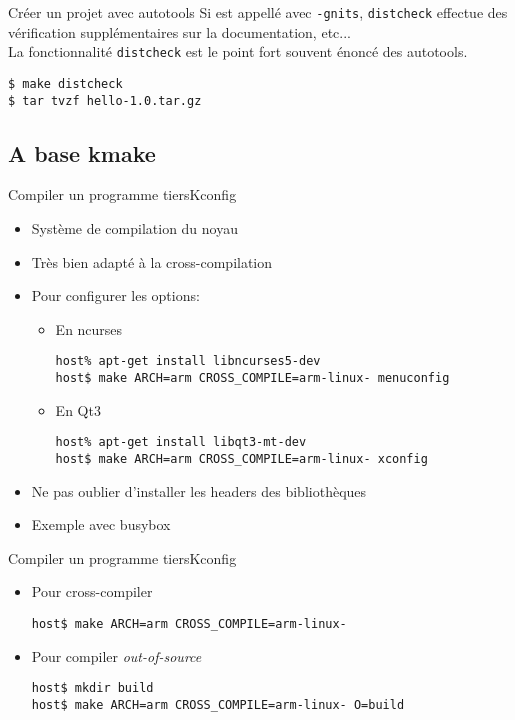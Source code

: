 \begin{frame}[fragile=singleslide]{Créer un projet avec autotools}
  Si   est appellé avec  \verb+-gnits+, \verb+distcheck+
  effectue des vérification supplémentaires sur la documentation,
  etc...
  \\[2ex]
  La fonctionnalité \verb+distcheck+ est  le point fort souvent énoncé
  des autotools.
\begin{lstlisting}
$ make distcheck
$ tar tvzf hello-1.0.tar.gz
\end{lstlisting} %
\end{frame}


\subsection{A base kmake}

\begin{frame}[fragile=singleslide]{Compiler un programme tiers}{Kconfig}
  \begin{itemize}
  \item Système de compilation du noyau
  \item Très bien adapté à la cross-compilation
  \item Pour configurer les options:
    \begin{itemize}
    \item En ncurses
\begin{lstlisting}
host% apt-get install libncurses5-dev
host$ make ARCH=arm CROSS_COMPILE=arm-linux- menuconfig
\end{lstlisting} %
    \item En Qt3
\begin{lstlisting}
host% apt-get install libqt3-mt-dev
host$ make ARCH=arm CROSS_COMPILE=arm-linux- xconfig
\end{lstlisting} %
    \end{itemize}
  \item Ne pas oublier d'installer les headers des bibliothèques
    \item Exemple avec busybox
  \end{itemize}
\end{frame}

\begin{frame}[fragile=singleslide]{Compiler un programme tiers}{Kconfig}
  \begin{itemize}
  \item Pour cross-compiler
\begin{lstlisting}
host$ make ARCH=arm CROSS_COMPILE=arm-linux-
\end{lstlisting} %
  \item Pour compiler \emph{out-of-source}
\begin{lstlisting}
host$ mkdir build
host$ make ARCH=arm CROSS_COMPILE=arm-linux- O=build
\end{lstlisting} %
  \end{itemize}
\end{frame}

